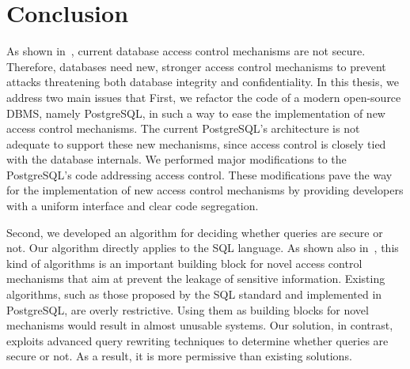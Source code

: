 \section{Conclusion}

As shown in~\cite{guarnieri2016strong}, current database access control mechanisms are not secure.
%
Therefore, databases need new, stronger access control mechanisms to prevent attacks threatening both database integrity and confidentiality. %
%
In this thesis, we address two main issues that 
%
First, we refactor the code of a modern open-source DBMS, namely PostgreSQL, in such a way to ease the implementation of new access control mechanisms.
%
The current PostgreSQL's architecture is not adequate to support these new mechanisms, since access control is closely tied with the database internals.
%
We performed  major modifications to the PostgreSQL's code addressing access control.
%
%
These modifications pave the way for the implementation of new access control mechanisms by providing developers with a uniform interface and clear code segregation.


Second, we developed an algorithm for deciding whether queries are secure or not.
%
Our algorithm directly applies to the SQL language.
%
As shown also in~\cite{guarnieri2016strong}, this kind of algorithms is an important building block for novel access control mechanisms that aim at prevent the leakage of sensitive information.
%
Existing algorithms, such as those proposed by the SQL standard and implemented in PostgreSQL, are overly restrictive.
%
Using them as building blocks for novel mechanisms would result in almost unusable systems.
%
Our solution, in contrast, exploits advanced query rewriting techniques to determine whether queries are secure or not. 
%
As a result, it is more permissive than existing solutions.




